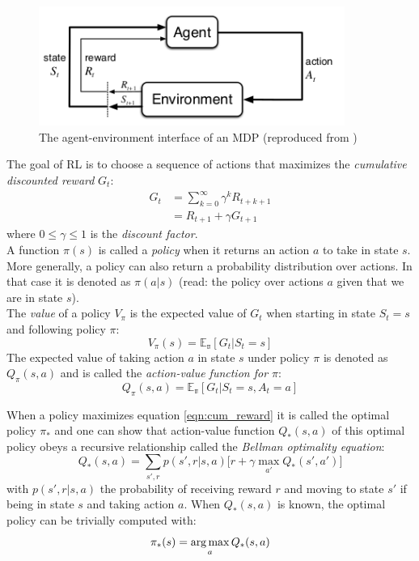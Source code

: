\begin{figure}[htp]
    \centering
    \includegraphics[width=10cm]{images/mdp.png}
    \caption{The agent-environment interface of an MDP (reproduced from \cite{sutton2018reinforcement})}
    \label{fig:mdp}
\end{figure}

The goal of RL is to choose a sequence of actions that maximizes the \emph{cumulative discounted reward} $G_t$:
\begin{equation}
\begin{split}
    G_t &= \sum_{k=0}^{\infty} \gamma^k R_{t+k+1} \\
        &= R_{t+1} + \gamma G_{t+1}
\end{split}
\label{eqn:cum_reward}
\end{equation}
where $0 \leqslant \gamma \leqslant 1$ is the \emph{discount factor}.\\

A function $\pi(s)$ is called a \emph{policy} when it returns an action $a$ to take in state $s$. More generally, a policy can also return a probability distribution over actions. In that case it is denoted as $\pi(a|s)$ (read: the policy over actions $a$ given that we are in state $s$).\\

The \emph{value} of a policy $V_{\pi}$ is the expected value of $G_t$ when starting in state $S_t=s$ and following policy $\pi$:
\begin{equation}
    V_{\pi}(s) = \mathbb{E_{\pi}}[G_t | S_t=s]
     \label{eq:definition_V}
\end{equation}
The expected value of taking action $a$ in state $s$ under policy $\pi$ is denoted as $Q_{\pi}(s,a)$ and is called the \emph{action-value function for $\pi$}:
\begin{equation}
    Q_{\pi}(s,a) = \mathbb{E_{\pi}}[G_t | S_t=s, A_t = a]
    \label{eq:definition_Q}
\end{equation}

When a policy maximizes equation \ref{eqn:cum_reward} it is called the optimal policy $\pi_{*}$ and one can show that action-value function $Q_{*}(s, a)$ of this optimal policy obeys a recursive relationship called the \emph{Bellman optimality equation}:
\begin{equation}
    Q_{*}(s,a) = \sum_{s', r} p(s', r | s, a) \big[r + \gamma \max_{a'} Q_{*}(s', a') \big]
    \label{eqn:bellman}
\end{equation}
with $p(s', r | s, a)$ the probability of receiving reward $r$ and moving to state $s'$ if being in state $s$ and taking action $a$. When $Q_{*}(s,a)$ is known, the optimal policy can be trivially computed with:
\begin{equation}
    \pi_{*}(s) = \operatorname*{arg\,max}_{a} Q_{*}(s, a)
    \label{eq:optimal_policy}
\end{equation}

